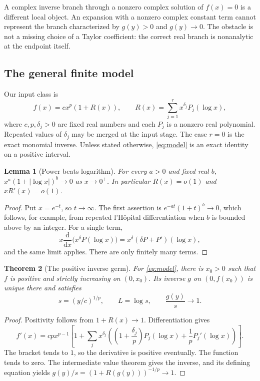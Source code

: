 \documentclass[11pt,a4paper]{article}
\numberwithin{equation}{section}
\newtheorem{theorem}{Theorem}[section]
\newtheorem{lemma}[theorem]{Lemma}
\theoremstyle{definition}
\newcommand{\dd}{\mathrm d}
\begin{document}
A complex inverse branch through a nonzero complex solution of $f(x)=0$
is a different local object. An expansion with a nonzero complex constant
term cannot represent the branch characterized by $g(y)>0$ and $g(y)\to0$.
The obstacle is not a missing choice of a Taylor coefficient: the correct
real branch is nonanalytic at the endpoint itself.

\subsection{The general finite model}
Our input class is
\begin{equation}\label{eq:model}
 f(x)=c x^p\left(1+R(x)\right),\qquad
 R(x)=\sum_{j=1}^r x^{\delta_j}P_j(\log x),
\end{equation}
where $c,p,\delta_j>0$ are fixed real numbers and each $P_j$ is a nonzero
real polynomial. Repeated values of $\delta_j$ may be merged at the input
stage. The case $r=0$ is the exact monomial inverse. Unless stated
otherwise, \eqref{eq:model} is an exact identity on a positive interval.

\begin{lemma}[Power beats logarithm]\label{lem:dominance}
For every $a>0$ and fixed real $b$, $x^a(1+|\log x|)^b\to0$ as
$x\to0^+$. In particular $R(x)=o(1)$ and $xR'(x)=o(1)$.
\end{lemma}
\begin{proof}
Put $x=e^{-t}$, so $t\to\infty$. The first assertion is
$e^{-at}(1+t)^b\to0$, which follows, for example, from repeated
l'H\^opital differentiation when $b$ is bounded above by an integer.
For a single term,
\[
 x\frac{\dd}{\dd x}\bigl(x^\delta P(\log x)\bigr)
 =x^\delta(\delta P+P')(\log x),
\]
and the same limit applies. There are only finitely many terms.
\end{proof}

\begin{theorem}[The positive inverse germ]\label{thm:branch}
For \eqref{eq:model}, there is $x_0>0$ such that $f$ is positive and
strictly increasing on $(0,x_0)$. Its inverse $g$ on $(0,f(x_0))$ is
unique there and satisfies
\begin{equation}\label{eq:scale}
 s=(y/c)^{1/p},\qquad L=\log s,\qquad \frac{g(y)}s\longrightarrow1.
\end{equation}
\end{theorem}
\begin{proof}
Positivity follows from $1+R(x)\to1$. Differentiation gives
\begin{equation}\label{eq:derivative-model}
 f'(x)=c p x^{p-1}\left[1+
 \sum_j x^{\delta_j}\left(
   \left(1+\frac{\delta_j}{p}\right)P_j(\log x)
       +\frac1pP_j'(\log x)\right)\right].
\end{equation}
The bracket tends to $1$, so the derivative is positive eventually. The
function tends to zero. The intermediate value theorem gives the inverse,
and its defining equation yields
$g(y)/s=(1+R(g(y)))^{-1/p}\to1$.
\end{proof}
\end{document}
